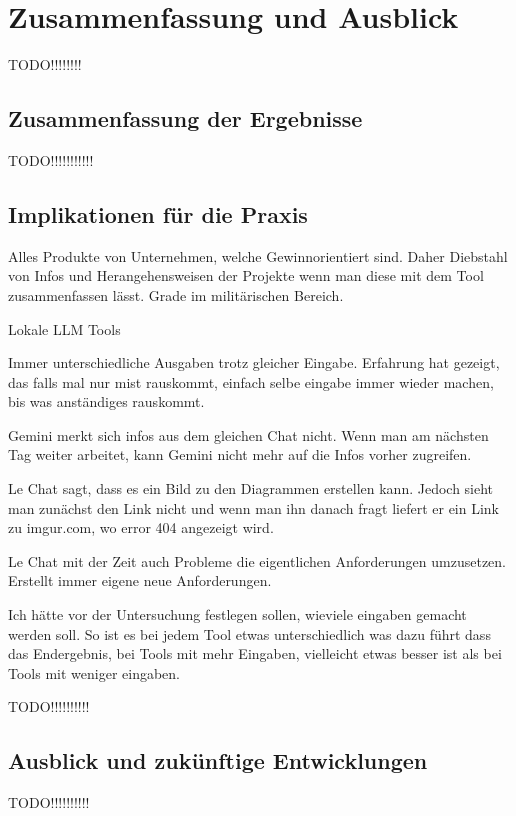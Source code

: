 
\chapter{Zusammenfassung und Ausblick} 

TODO!!!!!!!!

\section{Zusammenfassung der Ergebnisse}  \label{Zusammenfassung der Ergebnisse}

TODO!!!!!!!!!!!

\section{Implikationen für die Praxis}  \label{Implikationen für die Praxis}

Alles Produkte von Unternehmen, welche Gewinnorientiert sind. Daher Diebstahl von Infos und Herangehensweisen der Projekte 
wenn man diese mit dem Tool zusammenfassen lässt. Grade im militärischen Bereich.

Lokale LLM Tools

Immer unterschiedliche Ausgaben trotz gleicher Eingabe. Erfahrung hat gezeigt, das falls mal nur mist rauskommt, einfach selbe eingabe 
immer wieder machen, bis was anständiges rauskommt.

Gemini merkt sich infos aus dem gleichen Chat nicht. Wenn man am nächsten Tag weiter arbeitet, kann Gemini nicht mehr auf die Infos vorher 
zugreifen.

Le Chat sagt, dass es ein Bild zu den Diagrammen erstellen kann. Jedoch sieht man zunächst den Link nicht und wenn man ihn danach fragt 
liefert er ein Link zu imgur.com, wo error 404 angezeigt wird.

Le Chat mit der Zeit auch Probleme die eigentlichen Anforderungen umzusetzen. Erstellt immer eigene neue Anforderungen.

Ich hätte vor der Untersuchung festlegen sollen, wieviele eingaben gemacht werden soll. So ist es bei jedem Tool etwas unterschiedlich
was dazu führt dass das Endergebnis, bei Tools mit mehr Eingaben, vielleicht etwas besser ist als bei Tools mit weniger eingaben.

TODO!!!!!!!!!!

\section{Ausblick und zukünftige Entwicklungen}  \label{Ausblick und zukünftige Entwicklungen}

TODO!!!!!!!!!!